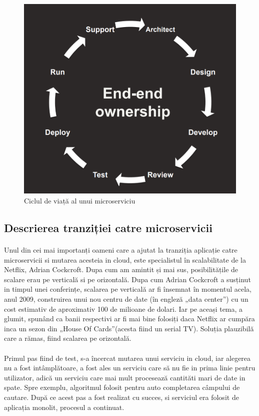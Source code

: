 \documentclass[12pt]{report}
\begin{document}
  	\begin{figure}[h]
  	\centering
  	\includegraphics[scale=.7]{endtoend}
	\caption{Ciclul de viață al unui microserviciu}  
	\label{endtoend}
  	\end{figure}
  	\subsection{Descrierea tranziției catre microservicii}
  	\paragraph{}Unul din cei mai importanți oameni care a ajutat la tranziția aplicație catre microservicii si mutarea acesteia in cloud, este specialistul în scalabilitate de la Netflix, Adrian Cockcroft. Dupa cum am amintit și mai sus, posibilitățile de scalare erau pe verticală si pe orizontală. Dupa cum Adrian Cockcroft a susținut in timpul unei conferințe, scalarea pe verticală ar fi însemnat în momentul acela, anul 2009, construirea unui nou centru de date (în engleză „data center”) cu un cost estimativ de aproximativ 100 de milioane de dolari. Iar pe aceași tema, a glumit, spunând ca banii respectivi ar fi mai bine folosiți daca Netflix ar cumpăra inca un sezon din „House Of Cards”(acesta fiind un serial TV). Soluția plauzibilă care a rămas, fiind scalarea pe orizontală.
  	\paragraph{}Primul pas fiind de test, s-a încercat mutarea unui serviciu in cloud, iar alegerea nu a fost intâmplătoare, a fost ales un serviciu care să nu fie in prima linie pentru utilizator, adică un serviciu care mai mult procesează cantităti mari de date in spate. Spre exemplu, algoritmul folosit pentru auto completarea câmpului de cautare. După ce acest pas a fost realizat cu succes, si serviciul era folosit de aplicația monolit, procesul a continuat.
\end{document}
